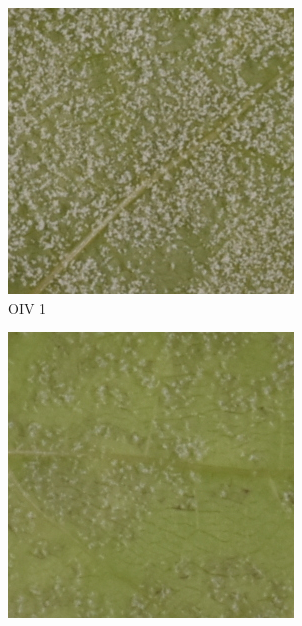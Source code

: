 \documentclass[english]{article}
\begin{document}
\begin{figure}[H]
    \centering
    \begin{subfigure}[b]{0.3\linewidth}
        \includegraphics[width=\linewidth]{Exp21DM02_inoc2_T6_P35_a_4.png}
        \caption{OIV 1}\label{fig:issuegood}
    \end{subfigure}
    \begin{subfigure}[b]{0.3\linewidth}
        \includegraphics[width=\linewidth]{Exp20DM01_inoc2_T6_P01_c_3.png}

\end{subfigure}
\end{figure}
\end{document}
